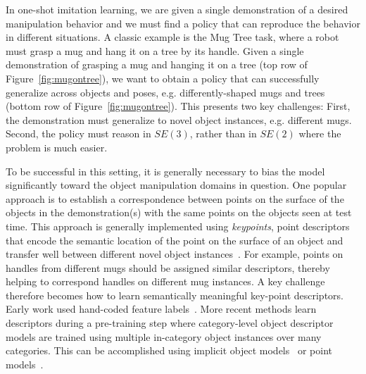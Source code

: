 \documentclass{article}
\begin{document}
In one-shot imitation learning, we are given a single demonstration of a desired manipulation behavior and we must find a policy that can reproduce the behavior in different situations. A classic example is the Mug Tree task, where a robot must grasp a mug and hang it on a tree by its handle. Given a single demonstration of grasping a mug and hanging it on a tree (top row of Figure~\ref{fig:mugontree}), we want to obtain a policy that can successfully generalize across objects and poses, e.g. differently-shaped mugs and trees (bottom row of Figure~\ref{fig:mugontree}). This presents two key challenges: First, the demonstration must generalize to novel object instances, e.g. different mugs. Second, the policy must reason in $SE(3)$, rather than in $SE(2)$ where the problem is much easier. 

To be successful in this setting, it is generally necessary to bias the model significantly toward the object manipulation domains in question. One popular approach is to establish a correspondence between points on the surface of the objects in the demonstration(s) with the same points on the objects seen at test time. This approach is generally implemented using \emph{keypoints}, point descriptors that encode the semantic location of the point on the surface of an object and transfer well between different novel object instances~\cite{pan2022tax,wang2019dynamic,manuelli2019kpam}. For example, points on handles from different mugs should be assigned similar descriptors, thereby helping to correspond handles on different mug instances. A key challenge therefore becomes how to learn semantically meaningful key-point descriptors. Early work used hand-coded feature labels~\cite{manuelli2019kpam}. More recent methods learn descriptors during a pre-training step where category-level object descriptor models are trained using multiple in-category object instances over many categories. This can be accomplished using implicit object models~\cite{simeonov2022neural} or point models~\cite{pan2022tax}. 


\end{document}

